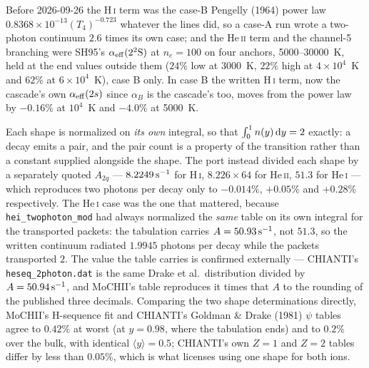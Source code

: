 \documentclass[english,a4paper]{my_memo}
\newcommand{\code}[1]{\texttt{#1}}
\begin{document}
Before 2026-09-26 the H\,\textsc{i} term was the case-B Pengelly (1964) power
law $0.8368{\times}10^{-13}(T_4)^{-0.723}$ whatever the lines did, so a
case-A run wrote a two-photon continuum $2.6$ times its own case; and the
He\,\textsc{ii} term and the channel-5 branching were SH95's
$\alpha_{\rm eff}(2^2{\rm S})$ at $n_e = 100$ on four anchors,
5000--30000~K, held at the end values outside them ($24\%$ low at 3000~K,
$22\%$ high at $4{\times}10^4$~K and $62\%$ at $6{\times}10^4$~K), case B
only.  In case B the written H\,\textsc{i} term, now the cascade's own
$\alpha_{\rm eff}(2s)$ since $\alpha_B$ is the cascade's too, moves from the
power law by $-0.16\%$ at $10^4$~K and $-4.0\%$ at 5000~K.

Each shape is normalized on \emph{its own} integral, so that
$\int_0^1 n(y)\,{\rm d}y = 2$ exactly: a decay emits a pair, and the pair
count is a property of the transition rather than a constant supplied
alongside the shape.  The port instead divided each shape by a separately
quoted $A_{2q}$ --- $8.2249\,{\rm s^{-1}}$ for H\,\textsc{i},
$8.226{\times}64$ for He\,\textsc{ii}, $51.3$ for He\,\textsc{i} --- which
reproduces two photons per decay only to $-0.014\%$, $+0.05\%$ and $+0.28\%$
respectively.  The He\,\textsc{i} case was the one that mattered, because
\code{hei\_twophoton\_mod} had always normalized the \emph{same} table on its
own integral for the transported packets: the tabulation carries
$A = 50.93\,{\rm s^{-1}}$, not $51.3$, so the written continuum radiated
$1.9945$ photons per decay while the packets transported $2$.  The value the
table carries is confirmed externally --- CHIANTI's
\code{heseq\_2photon.dat} is the same Drake et al.\ distribution divided by
$A = 50.94\,{\rm s^{-1}}$, and MoCHII's table reproduces it times that $A$ to
the rounding of the published three decimals.  Comparing the two shape
determinations directly, MoCHII's H-sequence fit and CHIANTI's Goldman \&
Drake (1981) $\psi$ tables agree to $0.42\%$ at worst (at $y=0.98$, where the
tabulation ends) and to $0.2\%$ over the bulk, with identical
$\langle y\rangle = 0.5$; CHIANTI's own $Z=1$ and $Z=2$ tables differ by less
than $0.05\%$, which is what licenses using one shape for both ions.
\end{document}
